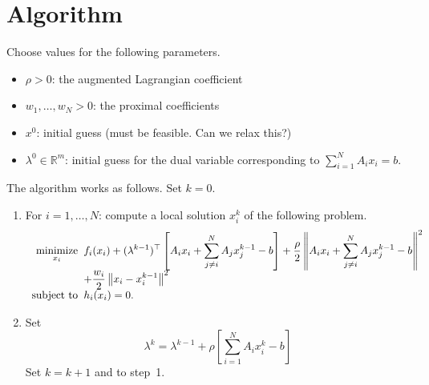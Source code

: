 \documentclass[11pt]{article}
\newcommand{\comment}[1]{{\color{red}#1}}
\newcommand{\norm}[1]{\left\lVert #1 \right\rVert}
\begin{document}
\section{Algorithm}
Choose values for the following parameters.
\begin{itemize}
    \item $\rho > 0$: the augmented Lagrangian coefficient
    \item $w_1, \ldots, w_N > 0$: the proximal coefficients
    \item $x^0$: initial guess (must be feasible. \comment{Can we relax this?})
    \item $\lambda^0 \in \mathbb{R}^{m}$: initial guess for the dual variable corresponding to $\sum_{i = 1}^N A_i x_i = b$.
\end{itemize}

The algorithm works as follows. Set $k = 0$.
\begin{enumerate}
    \item For $i = 1, \ldots, N$: compute a local solution $x_i^k$ of the following problem.
    \begin{equation}\label{eq:primalstep}
    \begin{array}{r@{\;\;}l}
    \displaystyle\mathop{\text{minimize}}_{x_i} & \displaystyle f_i(x_i) + (\lambda^{k-1})^\top \left[ A_ix_i + \sum_{j \neq i}^N A_j x_j^{k-1} - b\right] + \frac{\rho}{2} \norm{A_ix_i + \sum_{j \neq i}^N A_j x_j^{k-1} - b}^2  \\
    &\displaystyle + \frac{w_i}{2} \norm{x_i - x_i^{k-1}}^2\\
    \text{subject to} & \displaystyle  h_i(x_i) = 0.
    \end{array}
    \end{equation}
    
    \item Set 
    \begin{equation}\label{eq:dualstep}
    \lambda^k = \lambda^{k - 1} + \rho \left[\sum_{i = 1}^N A_i x_i^k - b\right]
    \end{equation}
    Set $k = k + 1$ and to step~1.
\end{enumerate}
\end{document}
